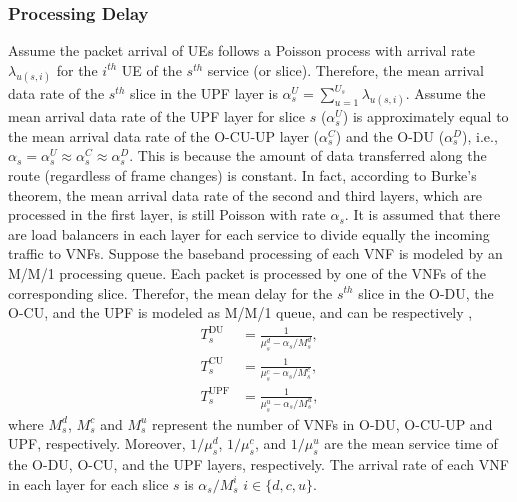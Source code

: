 \documentclass[lettersize,journal]{IEEEtran}
\begin{document}
\subsubsection{Processing Delay}
Assume the packet arrival of UEs follows a Poisson process with arrival rate $\lambda_{u(s,i)}$ for the $i^{th}$ UE of the $s^{th}$ service (or slice).
Therefore, the mean arrival data rate of the $s^{th}$ slice in the UPF layer is $\alpha_{s}^U = \sum_{u=1}^{U_s}\lambda_{u(s,i)}$.
Assume the mean arrival data rate of the UPF layer for slice $s$ ($\alpha_{s}^U$) is approximately equal to the mean arrival data rate of the O-CU-UP layer ($\alpha_{s}^C$) and the O-DU ($\alpha_{s}^D$), i.e., $\alpha_{s} =\alpha_{s}^U \approx \alpha_{s}^C \approx \alpha_{s}^D$. This is because the amount of data transferred along the route (regardless of frame changes) is constant.
In fact, according to Burke’s theorem, the mean arrival data rate of the second and third layers, which are processed in the first layer, is still Poisson with rate $\alpha_{s}$.
It is assumed that there are load balancers in each layer for each service to divide equally the incoming traffic to VNFs. %
Suppose the baseband processing of each VNF is modeled by an M/M/1 processing queue.
Each packet is processed by one of the VNFs of the corresponding slice. Therefor, the mean delay for the $s^{th}$ slice in the O-DU, the O-CU, and the UPF is modeled as M/M/1 queue, and can be respectively \cite{SystemCostMinimization,luong2018joint,luong2018novel},
\begin{align}
T_{s}^{\text{DU}} &= \frac{1}{\mu_s^d - \alpha_{s}/{M_s^{d}}},\\
T_{s}^{\text{CU}} &= \frac{1}{\mu_s^c - \alpha_{s}/{M_s^{c}}},\\
T_{s}^{\text{UPF}} &= \frac{1}{\mu_s^u - \alpha_{s}/{M_s^{u}}},
\end{align}
where $M_s^{d}$, $M_s^{c}$ and
$M_s^{u}$ represent the number of VNFs in O-DU, O-CU-UP and UPF, respectively.
Moreover, $1/\mu_s^d$, $1/\mu_s^c$, and $1/\mu_s^u$ are the mean service time of the O-DU, O-CU, and the UPF layers, respectively. The arrival rate of each VNF in each layer for each slice
$s$ is $\alpha_{s}/{M_s^{i}}$ $ i \in \{d,c, u\}$.
\end{document}
